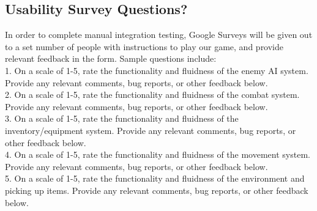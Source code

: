 \documentclass[12pt, titlepage]{article}
\begin{document}
\subsection{Usability Survey Questions?}

In order to complete manual integration testing, Google Surveys will be given out to a set number of people with instructions to play our game, and provide relevant feedback in the form. Sample questions include: \\

1. On a scale of 1-5, rate the functionality and fluidness of the enemy AI system. Provide any relevant comments, bug reports, or other feedback below.\\

2. On a scale of 1-5, rate the functionality and fluidness of the combat system. Provide any relevant comments, bug reports, or other feedback below.\\

3. On a scale of 1-5, rate the functionality and fluidness of the inventory/equipment system. Provide any relevant comments, bug reports, or other feedback below.\\

4. On a scale of 1-5, rate the functionality and fluidness of the movement system. Provide any relevant comments, bug reports, or other feedback below.\\

5. On a scale of 1-5, rate the functionality and fluidness of the environment and picking up items. Provide any relevant comments, bug reports, or other feedback below.\\
\end{document}

